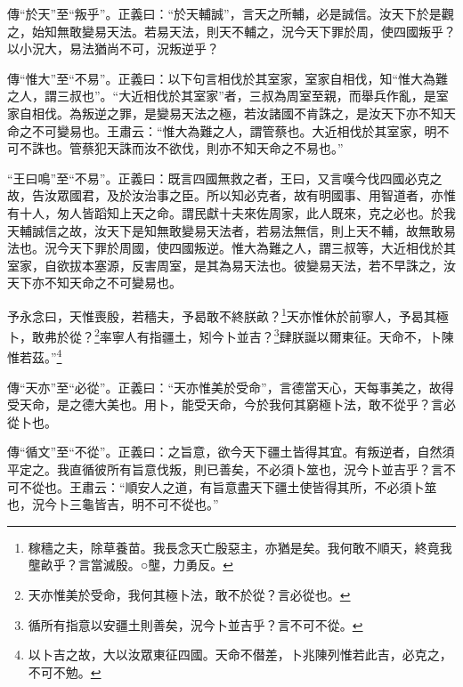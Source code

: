 {\noindent\zhuan{}\fzbyks 傳“於天”至“叛乎”。正義曰：“於天輔誠”，言天之所輔，必是誠信。汝天下於是觀之，始知無敢變易天法。若易天法，則天不輔之，況今天下罪於周，使四國叛乎？以小況大，易法猶尚不可，況叛逆乎？ \par}

{\noindent\zhuan{}\fzbyks 傳“惟大”至“不易”。正義曰：以下句言相伐於其室家，室家自相伐，知“惟大為難之人，謂三叔也”。“大近相伐於其室家”者，三叔為周室至親，而舉兵作亂，是室家自相伐。為叛逆之罪，是變易天法之極，若汝諸國不肯誅之，是汝天下亦不知天命之不可變易也。王肅云：“惟大為難之人，謂管蔡也。大近相伐於其室家，明不可不誅也。管蔡犯天誅而汝不欲伐，則亦不知天命之不易也。” \par}

{\noindent\shu{}\fzkt “王曰鳴”至“不易”。正義曰：既言四國無救之者，王曰，又言嘆今伐四國必克之故，告汝眾國君，及於汝治事之臣。所以知必克者，故有明國事、用智道者，亦惟有十人，匆人皆蹈知上天之命。謂民獻十夫來佐周家，此人既來，克之必也。於我天輔誠信之故，汝天下是知無敢變易天法者，若易法無信，則上天不輔，故無敢易法也。況今天下罪於周國，使四國叛逆。惟大為難之人，謂三叔等，大近相伐於其室家，自欲拔本塞源，反害周室，是其為易天法也。彼變易天法，若不早誅之，汝天下亦不知天命之不可變易也。 \par}

予永念曰，天惟喪殷，若穡夫，予曷敢不終朕畝？\footnote{稼穡之夫，除草養苗。我長念天亡殷惡主，亦猶是矣。我何敢不順天，終竟我壟畝乎？言當滅殷。○壟，力勇反。}天亦惟休於前寧人，予曷其極卜，敢弗於從？\footnote{天亦惟美於受命，我何其極卜法，敢不於從？言必從也。}率寧人有指疆土，矧今卜並吉？\footnote{循所有指意以安疆土則善矣，況今卜並吉乎？言不可不從。}肆朕誕以爾東征。天命不，卜陳惟若茲。”\footnote{以卜吉之故，大以汝眾東征四國。天命不僣差，卜兆陳列惟若此吉，必克之，不可不勉。}


{\noindent\zhuan{}\fzbyks 傳“天亦”至“必從”。正義曰：“天亦惟美於受命”，言德當天心，天每事美之，故得受天命，是之德大美也。用卜，能受天命，今於我何其窮極卜法，敢不從乎？言必從卜也。 \par}

{\noindent\zhuan{}\fzbyks 傳“循文”至“不從”。正義曰：之旨意，欲今天下疆土皆得其宜。有叛逆者，自然須平定之。我直循彼所有旨意伐叛，則已善矣，不必須卜筮也，況今卜並吉乎？言不可不從也。王肅云：“順安人之道，有旨意盡天下疆土使皆得其所，不必須卜筮也，況今卜三龜皆吉，明不可不從也。” \par}

